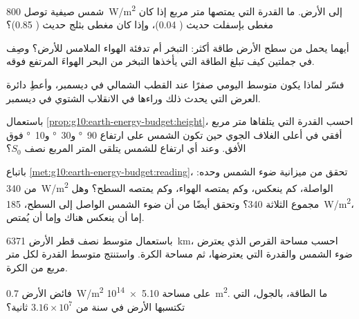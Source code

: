 \begin{exercise}[$\star$]\label{exo:g10:earth-energy-budget:3}
شمس صيفية توصل \qty{800}{W/m^2} إلى الأرض. ما القدرة التي يمتصها متر مربع إذا
كان مغطى بإسفلت حديث ( 0.04)، وإذا كان مغطى بثلج حديث (
0.85)؟
\end{exercise}

\begin{exercise}[$\star$]\label{exo:g10:earth-energy-budget:4}
أيهما يحمل من سطح الأرض طاقة أكثر: التبخر أم تدفئة الهواء الملامس للأرض؟ وصِف في
جملتين كيف تبلغ الطاقة التي يأخذها التبخر من البحر الهواءَ المرتفع
فوقه.
\end{exercise}

\begin{exercise}[$\star$]\label{exo:g10:earth-energy-budget:5}
فسّر لماذا يكون متوسط  اليومي صفرًا عند القطب الشمالي في ديسمبر،
وأعطِ دائرة العرض التي يحدث ذلك وراءها في الانقلاب الشتوي في ديسمبر.
\end{exercise}

\begin{exercise}[$\star\star$]\label{exo:g10:earth-energy-budget:6}
باستعمال \cref{prop:g10:earth-energy-budget:height}، احسب القدرة التي يتلقاها
متر مربع أفقي في أعلى الغلاف الجوي حين تكون الشمس على ارتفاع
\qty{90}{\degree} و\qty{30}{\degree} و\qty{10}{\degree} فوق الأفق.
وعند أي ارتفاع للشمس يتلقى المتر المربع نصف $S_0$؟
\end{exercise}

\begin{exercise}[$\star\star$]\label{exo:g10:earth-energy-budget:7}
باتباع \cref{met:g10:earth-energy-budget:reading}، تحقق من ميزانية ضوء
الشمس وحده: من \qty{340}{W/m^2} الواصلة، كم ينعكس، وكم يمتصه الهواء، وكم يمتصه
السطح؟ وهل مجموع الثلاثة 340؟ وتحقق أيضًا من أن ضوء الشمس الواصل إلى السطح،
\qty{185}{W/m^2}، إما أن ينعكس هناك وإما أن
يُمتص.
\end{exercise}

\begin{exercise}[$\star\star$]\label{exo:g10:earth-energy-budget:8}
باستعمال متوسط نصف قطر الأرض \qty{6371}{km}، احسب مساحة القرص الذي يعترض ضوء
الشمس والقدرة التي يعترضها، ثم مساحة الكرة. واستنتج متوسط القدرة لكل متر مربع من
الكرة.
\end{exercise}

\begin{exercise}[$\star\star$]\label{exo:g10:earth-energy-budget:9}
فائض الأرض \qty{0.7}{W/m^2} على مساحة
\qty{5.10e14}{m^2}. ما الطاقة، بالجول، التي تكتسبها الأرض في سنة من
$3.16\times10^7$ ثانية؟
\end{exercise}

